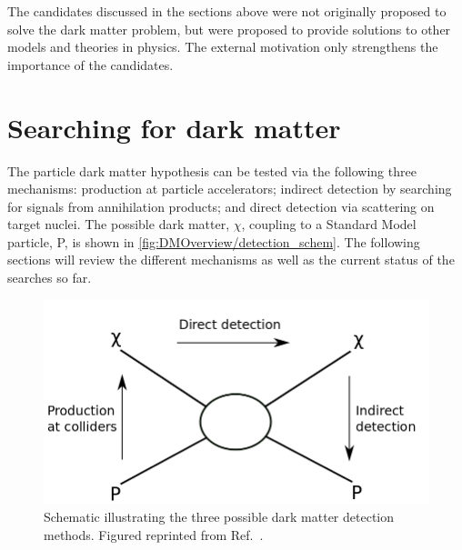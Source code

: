 \begin{flushleft}
The candidates discussed in the sections above were not originally proposed to solve the dark matter problem, but were proposed to provide solutions to other models and theories in physics. The external motivation only strengthens the importance of the candidates.
\end{flushleft}

\section{Searching for dark matter}\label{sec:DMOverview/DetectionOfDM}
The particle dark matter hypothesis can be tested via the following three mechanisms: production at particle accelerators; indirect detection by searching for signals from annihilation products; and direct detection via scattering on target nuclei. The possible dark matter, $\chi$, coupling to a Standard Model particle, P, is shown in \autoref{fig:DMOverview/detection_schem}. The following sections will review the different mechanisms as well as the current status of the searches so far. 
\begin{figure}[h!]
	\centering
	\includegraphics[width=0.6\linewidth]{figures/DMOverview/Detection_schematic.png}
	\caption[Schematic illustrating the possible dark matter detection methods.]{Schematic illustrating the three possible dark matter detection methods. Figured reprinted from Ref.~\cite{DirectDetection2015}.}
	\label{fig:DMOverview/detection_schem}
\end{figure}

